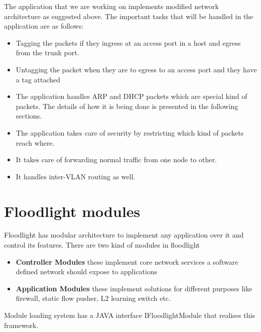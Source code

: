 The application that we are working on implements modified network architecture as suggested above. The important tasks that will be handled in the application are as follows:

\begin{itemize}
    \item Tagging the packets if they ingress at an access port in a host and egress
from the trunk port.
\item Untagging the packet when they are to egress to an access port and they
have a tag attached

\item The application handles ARP and DHCP packets which are special kind
of packets. The details of how it is being done is presented in the following
sections.

\item The application takes care of security by restricting which kind of packets
reach where.

\item It takes care of forwarding normal traffic from one node to other.

\item It handles inter-VLAN routing as well.




\end{itemize}



\section{Floodlight modules}
Floodlight has modular architecture to implement any application over it and control its features. There are two kind of modules in floodlight
\begin{itemize}
    \item \textbf{Controller Modules} these implement core network services a software defined network should expose to applications
    \item \textbf{Application Modules} these implement solutions for different purposes like firewall, static flow pusher, L2 learning switch etc.
\end{itemize}

Module loading system has a JAVA interface IFloodlightModule that realises this framework.
